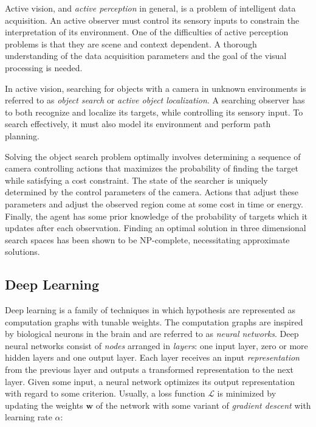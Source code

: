 Active vision, and \textit{active perception} in general, is a problem of intelligent data acquisition.
An active observer must control its sensory inputs to constrain the interpretation of its environment.
One of the difficulties of active perception problems is that they are scene and context dependent.
A thorough understanding of the data acquisition parameters and the goal of the visual processing is needed.~\cite{bajcsy_active_1988}


In active vision, searching for objects with a camera in unknown environments is referred to as \textit{object search} or \textit{active object localization}.
A searching observer has to both recognize and localize its targets, while controlling its sensory input.
To search effectively, it must also model its environment and perform path planning.~\cite{chen_activevisionsurvey_2011}

Solving the object search problem optimally involves determining a sequence of camera controlling actions that maximizes the probability of finding the target while satisfying a cost constraint.
The state of the searcher is uniquely determined by the control parameters of the camera.
Actions that adjust these parameters and adjust the observed region come at some cost in time or energy.
Finally, the agent has some prior knowledge of the probability of targets which it updates after each observation.
Finding an optimal solution in three dimensional search spaces has been shown to be NP-complete, necessitating approximate solutions.~\cite{ye_tsotsos_2001,andreopoulos_tsotsos_theory_2009}

\subsection{Deep Learning}
\label{sec:deeplearning}

Deep learning is a family of techniques in which hypothesis are represented as computation graphs with tunable weights.
The computation graphs are inspired by biological neurons in the brain and are referred to as \textit{neural networks}.
Deep neural networks consist of \textit{nodes} arranged in \textit{layers}: one input layer, zero or more hidden layers and one output layer.
Each layer receives an input \textit{representation}~\cite{bengio_representation_2014} from the previous layer and outputs a transformed representation to the next layer.
Given some input, a neural network optimizes its output representation with regard to some criterion.
Usually, a loss function \(\mathcal{L}\) is minimized by updating the weights \(\mathbf{w}\) of the network with some variant of \textit{gradient descent} with learning rate \(\alpha\):

